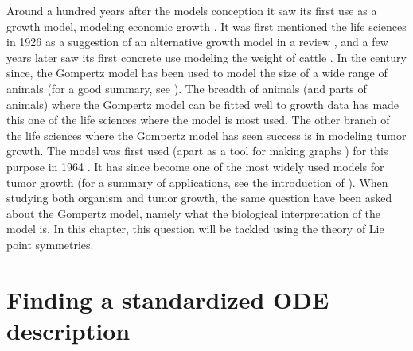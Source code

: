 Around a hundred years after the models conception it saw its first use as a growth model, modeling economic growth \cite{prescott1922demand,peabody1924railway}.
It was first mentioned the life sciences in 1926 as a suggestion of an alternative growth model in a review \cite{wright1926reviews}, and a few years later saw its first concrete use modeling the weight of cattle \cite{davidson1928growth}.
In the century since, the Gompertz model has been used to model the size of a wide range of animals (for a good summary, see \cite{tjorve2017gompertz}).
The breadth of animals (and parts of animals) where the Gompertz model can be fitted well to growth data has made this one of the life sciences where the model is most used.
The other branch of the life sciences where the Gompertz model has seen success is in modeling tumor growth.
The model was first used (apart as a tool for making graphs \cite{casey1934alteration}) for this purpose in 1964 \cite{laird1964dynamics}.
It has since become one of the most widely used models for tumor growth \cite{gerlee2013muddle} (for a summary of applications, see the introduction of \cite{benzekry2014classical}).
When studying both organism and tumor growth, the same question have been asked about the Gompertz model, namely what the biological interpretation of the model is.
In this chapter, this question will be tackled using the theory of Lie point symmetries.

\section{Finding a standardized ODE description}

